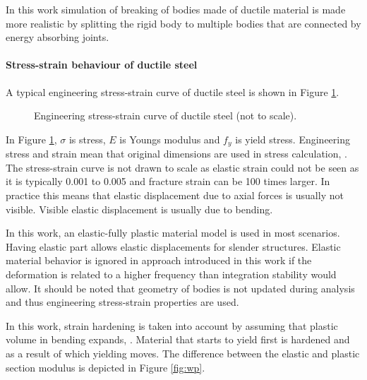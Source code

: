 \documentclass{jcgt}
\begin{document}
In this work simulation of breaking of bodies made of ductile material is made more realistic 
by splitting the rigid body
to multiple bodies that are connected by energy absorbing joints.

\paragraph{Stress-strain behaviour of ductile steel}
A typical engineering stress-strain curve of ductile steel is shown in Figure \ref{fig:sscurve}.


\begin{figure}
\centering
{}
\caption{Engineering stress-strain curve of ductile steel (not to scale).}
\label{fig:sscurve}
\end{figure}

In Figure \ref{fig:sscurve}, $\sigma$ is stress, $E$ is Youngs modulus and $f_y$ is yield stress.
Engineering stress and strain mean that original dimensions are used in stress calculation,
\cite{dowling}.
The stress-strain curve is not drawn to scale as elastic strain could not be seen as it is typically 
0.001 to 0.005 and fracture strain can be 100 times larger.
In practice this means that elastic displacement due to axial forces is usually not visible.
Visible elastic displacement is usually due to bending.

In this work, an elastic-fully plastic material model is used in most scenarios.
Having elastic part allows elastic displacements for slender structures. 
Elastic material behavior is ignored in approach introduced in this work if
the deformation is related to a higher frequency
than integration stability would allow.
It should be noted that geometry
of bodies is not updated during analysis and thus engineering stress-strain properties are used.

In this work, strain hardening is taken into account by assuming that plastic volume in bending
expands, 
\cite{dowling}.
Material that starts to yield first is hardened and as a result of which yielding moves.
%
The difference between the elastic and plastic section modulus is depicted in Figure \ref{fig:wp}.
\end{document}
